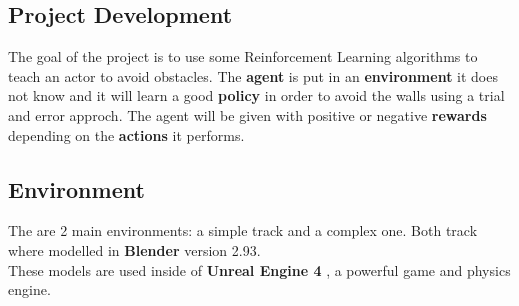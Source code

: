 \documentclass[14pt]{extarticle}
\def\sp{\vspace{5pt}}
\begin{document}
\newpage
\begin{center}
	\section{Project Development}
	\sp
\end{center}
\begin{flushleft}
	The goal of the project is to use some Reinforcement Learning algorithms to teach an actor to avoid obstacles. The \textbf{agent} is put in an \textbf{environment} it does not know and it will learn a good \textbf{policy} in order to avoid the walls using a trial and error approch. The agent will be given with positive or negative \textbf{rewards} depending on the \textbf{actions} it performs. 
	
	\subsection{Environment}
	\sp
	The are 2 main environments: a simple track and a complex one. Both track where modelled in \textbf{Blender} version 2.93\cite{Blender}. \\
	These models are used inside of \textbf{Unreal Engine 4} \cite{UE4}, a powerful game and physics engine.
	

\end{flushleft}
\end{document}

